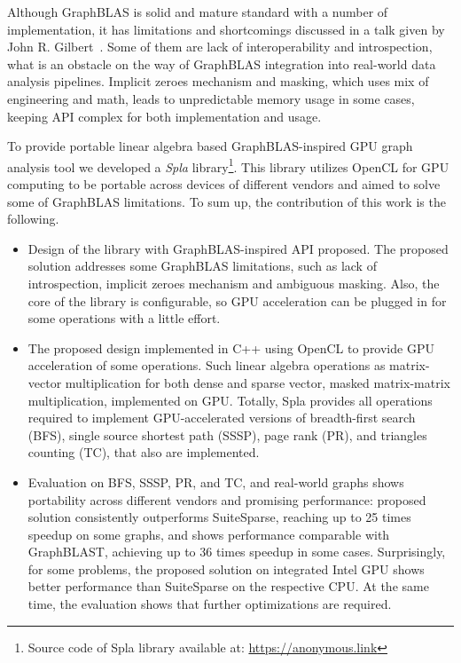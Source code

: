 Although GraphBLAS is solid and mature standard with a number of implementation, it has limitations and shortcomings discussed in a talk given by John R. Gilbert~\cite{talk:graphblas_did_wrong}. Some of them are lack of interoperability and introspection, what is an obstacle on the way of GraphBLAS integration into real-world data analysis pipelines. Implicit zeroes mechanism and masking, which uses mix of engineering and math, leads to unpredictable memory usage in some cases, keeping API complex for both implementation and usage.

To provide portable linear algebra based GraphBLAS-inspired GPU graph analysis tool we developed a \textit{Spla} library\footnote{Source code of Spla library available at: \url{https://anonymous.link}}.
This library utilizes OpenCL for GPU computing to be portable across devices of different vendors and aimed to solve some of GraphBLAS limitations.
To sum up, the contribution of this work is the following.
\begin{itemize}
    \item Design of the library with GraphBLAS-inspired API proposed. The proposed solution addresses some GraphBLAS limitations, such as lack of introspection, implicit zeroes mechanism and ambiguous masking. Also, the core of the library is configurable, so GPU acceleration can be plugged in for some operations with a little effort.
    \item The proposed design implemented in C++ using OpenCL to provide GPU acceleration of some operations. Such linear algebra operations as matrix-vector multiplication for both dense and sparse vector, masked matrix-matrix multiplication, implemented on GPU. Totally, Spla provides all operations required to implement GPU-accelerated versions of breadth-first search (BFS), single source shortest path (SSSP), page rank (PR), and triangles counting (TC), that also are implemented.
    \item Evaluation on BFS, SSSP, PR, and TC, and real-world graphs shows portability across different vendors and promising performance: proposed solution consistently outperforms SuiteSparse, reaching up to 25 times speedup on some graphs, and shows performance comparable with GraphBLAST, achieving up to 36 times speedup in some cases. Surprisingly, for some problems, the proposed solution on integrated Intel GPU shows better performance than SuiteSparse on the respective CPU. At the same time, the evaluation shows that further optimizations are required.
\end{itemize}